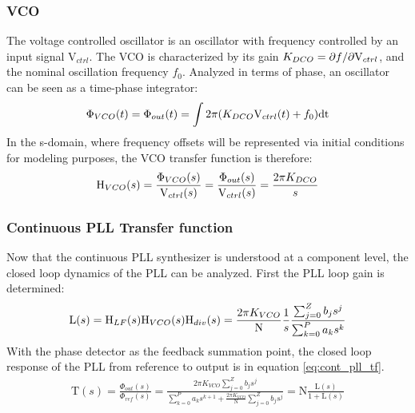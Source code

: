 		\subsubsection{VCO}
			The voltage controlled oscillator is an oscillator with frequency controlled by an input signal V$_{ctrl}$. The VCO is characterized by its gain $K_{DCO} = \partial f/\partial \textnormal{V}_{ctrl}$, and the nominal oscillation frequency $f_0$. Analyzed in terms of phase, an oscillator can be seen as a time-phase integrator:
			\begin{equation}
				\Phi_{VCO}(t) = \Phi_{out}(t) = \int2\pi(K_{DCO}\textnormal{V}_{ctrl}(t) + f_0)\mathrm{dt}
			\end{equation}
			In the s-domain, where frequency offsets will be represented via initial conditions for modeling purposes, the VCO transfer function is therefore:
			\begin{equation}
				\mathrm{H}_{VCO}(s) = \frac{\Phi_{VCO}(s)}{\textnormal{V}_{ctrl}(s)} = \frac{\Phi_{out}(s)}{\textnormal{V}_{ctrl}(s)} = \frac{2\pi K_{DCO}}{s}
			\end{equation}

		\subsubsection{Continuous PLL Transfer function}\label{cont_pll_tf}
			Now that the continuous PLL synthesizer is understood at a component level, the closed loop dynamics of the PLL can be analyzed. First the PLL loop gain is determined:
			\begin{equation}
				\mathrm{L}(s) = \textnormal{H}_{LF}(s)\textnormal{H}_{VCO}(s)\textnormal{H}_{div}(s) = \frac{2\pi K_{VCO}}{\mathrm{N}}\frac{1}{s}\frac{\sum_{j=0}^Z b_js^j}{\sum_{k=0}^P a_ks^k}
			\end{equation}
			With the phase detector as the feedback summation point, the closed loop response of the PLL from reference to output is in equation \ref{eq:cont_pll_tf}.
			\begin{align} \label{eq:cont_pll_tf}
				\mathrm{T}(s) = \frac{\Phi_{out}(s)}{\Phi_{ref}(s)} = \frac{2\pi K_{VCO}\sum_{j=0}^Z b_js^j}{\sum_{k=0}^P a_ks^{k+1} + \frac{2\pi K_{VCO}}{\mathrm{N}}\sum_{j=0}^Z b_js^j} = \mathrm{N}\frac{\mathrm{L}(s)}{1 + \mathrm{L}(s)}
			\end{align}


